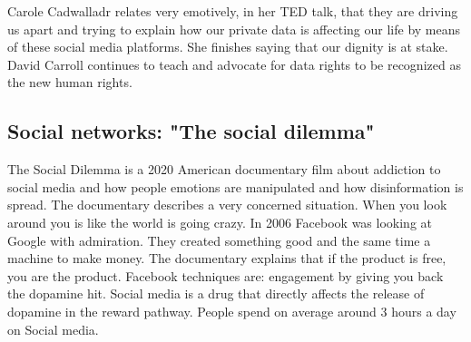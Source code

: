  
   
 
 Carole Cadwalladr relates very emotively, in her TED talk, that they are driving us apart
 and trying to explain how our private data  is affecting our life by means of these social media platforms. 
 She finishes saying that our dignity is at stake. 
 David Carroll continues to teach and advocate for data rights to be recognized as the new human rights. 
 
   
   
   
   
   
   
   
   
   
   
   
   
   
   
   
   
   
   
   
  
\newpage         
        \subsection*{Social networks: "The social dilemma"}
The Social Dilemma is a 2020 American documentary film about 
addiction to social media and how people emotions are manipulated  
and how disinformation is spread.
The documentary describes a very concerned situation. 
When you look around you is like the world is going crazy. 
In 2006 Facebook was looking at Google with admiration. 
They created something good and the same time a machine to make money.  
The documentary explains that if the  product is free, you are the product.  
Facebook techniques are: engagement by  giving you back the dopamine hit. 
Social media is a drug that directly affects the release of dopamine in the reward pathway. 
People spend on average around 3 hours a day on Social media. 
  
